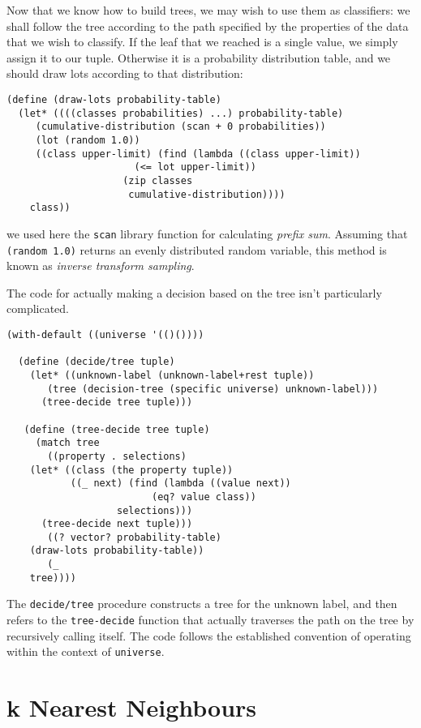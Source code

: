 Now that we know how to build trees, we may wish to use
them as classifiers: we shall follow the tree according
to the path specified by the properties of the data that
we wish to classify. If the leaf that we reached is
a single value, we simply assign it to our tuple.
Otherwise it is a probability distribution table, and
we should draw lots according to that distribution:

\begin{Verbatim}[samepage=true]
(define (draw-lots probability-table)
  (let* ((((classes probabilities) ...) probability-table)
	 (cumulative-distribution (scan + 0 probabilities))
	 (lot (random 1.0))
	 ((class upper-limit) (find (lambda ((class upper-limit))
				      (<= lot upper-limit))
				    (zip classes 
					 cumulative-distribution))))
    class))
\end{Verbatim}

we used here the \texttt{scan} library function for calculating
\textit{prefix sum}. Assuming that \texttt{(random 1.0)} returns
an evenly distributed random variable, this method is known
as \textit{inverse transform sampling}.

The code for actually making a decision based on the tree
isn't particularly complicated.
\begin{Verbatim}[samepage=true]
(with-default ((universe '(()())))

  (define (decide/tree tuple)
    (let* ((unknown-label (unknown-label+rest tuple))
	   (tree (decision-tree (specific universe) unknown-label)))
      (tree-decide tree tuple)))
  
   (define (tree-decide tree tuple)
     (match tree
       ((property . selections)
	(let* ((class (the property tuple))
	       ((_ next) (find (lambda ((value next)) 
		                 (eq? value class)) 
			       selections)))
	  (tree-decide next tuple)))
       ((? vector? probability-table)
	(draw-lots probability-table))
       (_
	tree))))
\end{Verbatim}
The \texttt{decide/tree} procedure constructs a tree for the
unknown label, and then refers to the \texttt{tree-decide}
function that actually traverses the path on the tree by
recursively calling itself. The code follows the established
convention of operating within the context of \texttt{universe}.

\section{k Nearest Neighbours}

